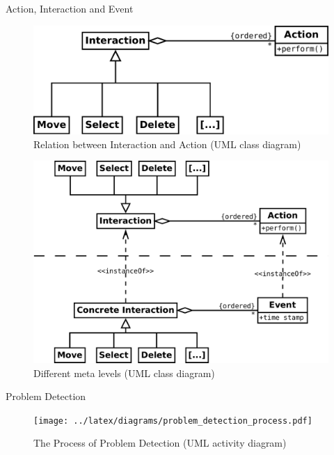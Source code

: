 \documentclass[compress]{beamer}
\begin{document}
\begin{frame}[allowframebreaks]{Action, Interaction and Event}
\begin{figure}
    \centering
    \includegraphics[width=\textwidth]{diagrams/action_interaction_simple.pdf}
    \caption{Relation between Interaction and Action (UML class diagram)}
\end{figure}

\begin{figure}
    \centering
    \includegraphics[height=0.6\textheight]{diagrams/action_interaction_complex.pdf}
    \caption{Different meta levels (UML class diagram)}
\end{figure}
\end{frame}


\begin{frame}{Problem Detection}
\begin{figure}
    \centering
    \texttt{[image: ../latex/diagrams/problem\_detection\_process.pdf]}
    \caption{The Process of Problem Detection (UML activity diagram)}
\end{figure}
\end{frame}
\end{document}
